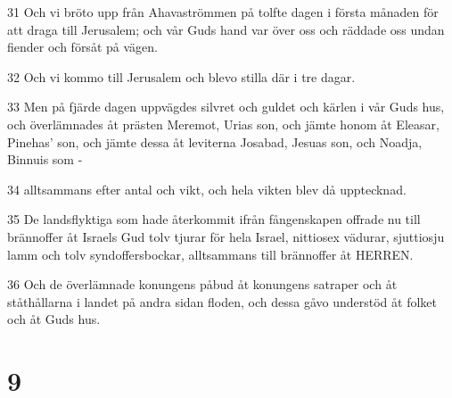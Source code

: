 \par 31 Och vi bröto upp från Ahavaströmmen på tolfte dagen i första månaden för att draga till Jerusalem; och vår Guds hand var över oss och räddade oss undan fiender och försåt på vägen.
\par 32 Och vi kommo till Jerusalem och blevo stilla där i tre dagar.
\par 33 Men på fjärde dagen uppvägdes silvret och guldet och kärlen i vår Guds hus, och överlämnades åt prästen Meremot, Urias son, och jämte honom åt Eleasar, Pinehas' son, och jämte dessa åt leviterna Josabad, Jesuas son, och Noadja, Binnuis som -
\par 34 alltsammans efter antal och vikt, och hela vikten blev då upptecknad.
\par 35 De landsflyktiga som hade återkommit ifrån fångenskapen offrade nu till brännoffer åt Israels Gud tolv tjurar för hela Israel, nittiosex vädurar, sjuttiosju lamm och tolv syndoffersbockar, alltsammans till brännoffer åt HERREN.
\par 36 Och de överlämnade konungens påbud åt konungens satraper och åt ståthållarna i landet på andra sidan floden, och dessa gåvo understöd åt folket och åt Guds hus.

\chapter{9}

